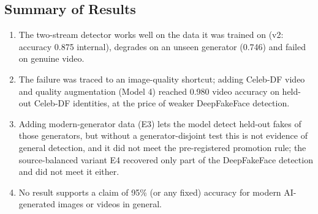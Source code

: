 \subsection{Summary of Results}
\begin{enumerate}
\item The two-stream detector works well on the data it was trained on (v2: accuracy 0.875 internal), degrades on an unseen generator (0.746) and failed on genuine video.
\item The failure was traced to an image-quality shortcut; adding Celeb-DF video and quality augmentation (Model 4) reached 0.980 video accuracy on held-out Celeb-DF identities, at the price of weaker DeepFakeFace detection.
\item Adding modern-generator data (E3) lets the model detect held-out fakes of those generators, but without a generator-disjoint test this is not evidence of general detection, and it did not meet the pre-registered promotion rule; the source-balanced variant E4 recovered only part of the DeepFakeFace detection and did not meet it either.
\item No result supports a claim of 95\% (or any fixed) accuracy for modern AI-generated images or videos in general.
\end{enumerate}
